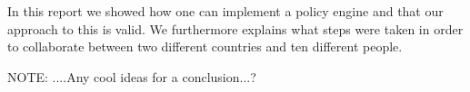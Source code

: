 In this report we showed how one can implement a policy engine and that our approach to this is valid. We furthermore explains what steps were taken in order to collaborate between two different countries and ten different people. 

NOTE: ....Any cool ideas for a conclusion...?